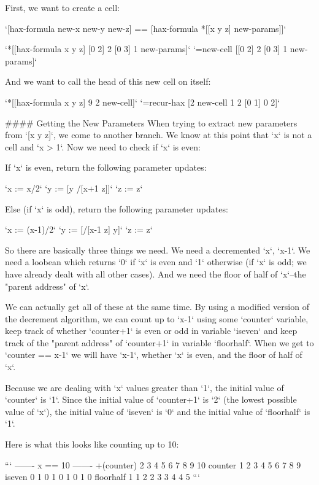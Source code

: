 \documentclass[twoside]{article}
\begin{document}
First, we want to create a cell:

`[hax-formula new-x new-y new-z] == [hax-formula *[[x y z] new-params]]`

`*[[hax-formula x y z] [0 2] 2 [0 3] 1 new-params]`  
`=new-cell [[0 2] 2 [0 3] 1 new-params]`

And we want to call the head of this new cell on itself:

`*[[hax-formula x y z] 9 2 new-cell]`  
`=recur-hax [2 new-cell 1 2 [0 1] 0 2]`

#### Getting the New Parameters
When trying to extract new parameters from `[x y z]`, we come to another branch. We know at this point that `x` is not a cell and `x > 1`. Now we need to check if `x` is even:

If `x` is even, return the following parameter updates:

`x := x/2`  
`y := [y /[x+1 z]]`  
`z := z`  

Else (if `x` is odd), return the following parameter updates:

`x := (x-1)/2`  
`y := [/[x-1 z] y]`  
`z := z`  

So there are basically three things we need. We need a decremented `x`, `x-1`. We need a loobean which returns `0` if `x` is even and `1` otherwise (if `x` is odd; we have already dealt with all other cases). And we need the floor of half of `x`--the "parent address" of `x`.

We can actually get all of these at the same time. By using a modified version of the decrement algorithm, we can count up to `x-1` using some `counter` variable, keep track of whether `counter+1` is even or odd in variable `iseven` and keep track of the "parent address" of `counter+1` in variable `floorhalf`. When we get to `counter == x-1` we will have `x-1`, whether `x` is even, and the floor of half of `x`.

Because we are dealing with `x` values greater than `1`, the initial value of `counter` is `1`. Since the initial value of `counter+1` is `2` (the lowest possible value of `x`), the initial value of `iseven` is `0` and the initial value of `floorhalf` is `1`.

Here is what this looks like counting up to 10:

```
                     -------
                     x == 10
                     -------
+(counter)  2  3  4  5  6  7  8  9 10
counter     1  2  3  4  5  6  7  8  9
iseven      0  1  0  1  0  1  0  1  0
floorhalf   1  1  2  2  3  3  4  4  5
```
\end{document}
